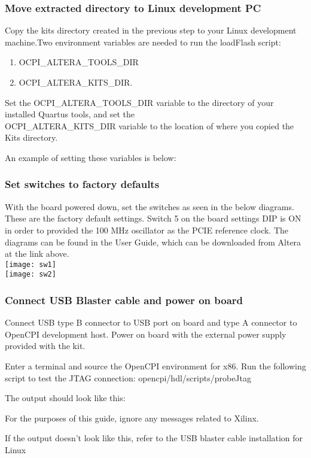 \subsubsection*{Move extracted directory to Linux development PC}
Copy the kits directory created in the previous step to your Linux development machine.Two environment variables are needed to run the loadFlash script:
\begin{enumerate}
\item OCPI\_ALTERA\_TOOLS\_DIR
\item OCPI\_ALTERA\_KITS\_DIR.
\end{enumerate}
Set the OCPI\_ALTERA\_TOOLS\_DIR variable to the directory of your installed Quartus tools, and set the \\OCPI\_ALTERA\_KITS\_DIR variable to the location of where you copied the Kits directory.\par\smallskip
\noindent An example of setting these variables is below:\par\smallskip
\noindent{}
\subsubsection*{Set switches to factory defaults}
 With the board powered down, set the switches as seen in the below diagrams. These are the factory default settings. Switch 5 on the board settings DIP is ON in order to provided the 100 MHz oscillator as the PCIE reference clock. The diagrams can be found in the User Guide, which can be downloaded from Altera at the link above.\\\smallskip
\texttt{[image: sw1]}\\
\texttt{[image: sw2]}\\
\subsubsection*{Connect USB Blaster cable and power on board}
Connect USB type B connector to USB port on board and type A connector to OpenCPI development host. Power on board with the external power supply provided with the kit.\par\smallskip
\noindent Enter a terminal and source the OpenCPI environment for x86. Run the following script to test the JTAG connection: opencpi/hdl/scripts/probeJtag\par\smallskip
\noindent The output should look like this:\par\smallskip
\noindent{}\par\bigskip
\noindent For the purposes of this guide, ignore any messages related to Xilinx.\par\medskip
\noindent If the output doesn't look like this, refer to the USB blaster cable installation for Linux
